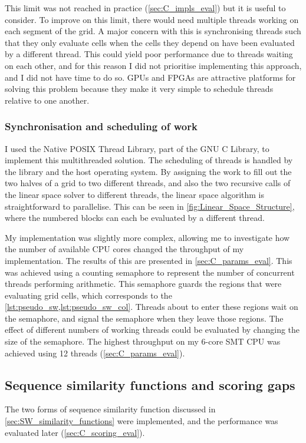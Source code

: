 This limit was not reached in practice (\cref{sec:C_impls_eval}) but it is useful to consider.
To improve on this limit, there would need multiple threads working on each segment of the grid.
A major concern with this is synchronising threads such that they only evaluate cells when the cells they depend on have been evaluated by a different thread.
This could yield poor performance due to threads waiting on each other, and for this reason I did not prioritise implementing this approach, and I did not have time to do so.
GPUs and FPGAs are attractive platforms for solving this problem because they make it very simple to schedule threads relative to one another.

\subsubsection{Synchronisation and scheduling of work}
\label{sec:Sync_and_scheduling_of_multi-threaded_C}
I used the Native POSIX Thread Library, part of the GNU C Library, to implement this multithreaded solution.
The scheduling of threads is handled by the library and the host operating system.
By assigning the work to fill out the two halves of a grid to two different threads, and also the two recursive calls of the linear space solver to different threads, the linear space algorithm is straightforward to parallelise.
This can be seen in \cref{fig:Linear_Space_Structure}, where the numbered blocks can each be evaluated by a different thread.

My implementation was slightly more complex, allowing me to investigate how the number of available CPU cores changed the throughput of my implementation.
The results of this are presented in \cref{sec:C_params_eval}.
This was achieved using a counting semaphore to represent the number of concurrent threads performing arithmetic.
This semaphore guards the regions that were evaluating grid cells, which corresponds to the \cref{lst:pseudo_sw,lst:pseudo_sw_col}.
Threads about to enter these regions wait on the semaphore, and signal the semaphore when they leave those regions.
The effect of different numbers of working threads could be evaluated by changing the size of the semaphore.
The highest throughput on my 6-core SMT CPU was achieved using 12 threads (\cref{sec:C_params_eval}).

\subsection{Sequence similarity functions and scoring gaps}
\label{sec:Scoring_in_C_impl}
The two forms of sequence similarity function discussed in \cref{sec:SW_similarity_functions} were implemented, and the performance was evaluated later (\cref{sec:C_scoring_eval}).

